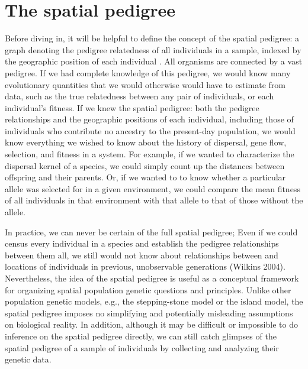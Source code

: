 \documentclass{ar-1col}
\begin{document}
\section{The spatial pedigree}
Before diving in, 
it will be helpful to define the concept of the spatial pedigree: 
a graph denoting the pedigree relatedness of all individuals in a sample, 
indexed by the geographic position of each individual .
All organisms are connected by a vast pedigree. 
If we had complete knowledge of this pedigree, 
we would know many evolutionary quantities 
that we would otherwise would have to estimate from data, 
such as the true relatedness between any pair of individuals, 
or each individual's fitness.
If we knew the spatial pedigree:
both the pedigree relationships 
and the geographic positions of each individual, 
including those of individuals 
who contribute no ancestry to the present-day population, 
we would know everything we wished to know about 
the history of dispersal, gene flow, 
selection, and fitness in a system.
For example, if we wanted to characterize the dispersal kernel of a species, 
we could simply count up the distances between offspring and their parents.
Or, if we wanted to to know whether a particular allele 
was selected for in a given environment, 
we could compare the mean fitness of all individuals in that environment with that allele 
to that of those without the allele.

In practice, we can never be certain of the full spatial pedigree;
Even if we could census every individual in a species 
and establish the pedigree relationships between them all, 
we still would not know about relationships between 
and locations of individuals in previous, unobservable generations (Wilkins 2004).
Nevertheless, the idea of the spatial pedigree is useful
as a conceptual framework for organizing 
spatial population genetic questions and principles.
Unlike other population genetic models, 
e.g., the stepping-stone model or the island model,
the spatial pedigree imposes no simplifying 
and potentially misleading assumptions on biological reality.
In addition, although it may be difficult or impossible 
to do inference on the spatial pedigree directly, 
we can still catch glimpses of the spatial pedigree of a sample of individuals 
by collecting and analyzing their genetic data.
\end{document}
